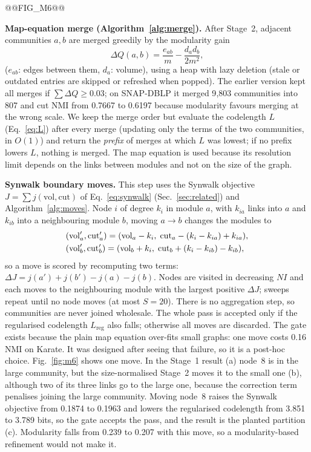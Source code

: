 \documentclass[conference]{IEEEtran}
\begin{document}
@@FIG_M6@@

\textbf{Map-equation merge (Algorithm~\ref{alg:merge}).} After Stage~2, adjacent communities $a,b$ are merged greedily by the modularity gain
\begin{equation}
\Delta Q(a,b)=\frac{e_{ab}}{m}-\frac{d_ad_b}{2m^2},\label{eq:dq}
\end{equation}
($e_{ab}$: edges between them, $d_a$: volume), using a heap with lazy deletion (stale or outdated entries are skipped or refreshed when popped). The earlier version kept all merges if $\sum\Delta Q\ge0.03$; on SNAP-DBLP it merged 9{,}803 communities into 807 and cut NMI from 0.7667 to 0.6197 because modularity favours merging at the wrong scale. We keep the merge order but evaluate the codelength $L$ (Eq.~\eqref{eq:L}) after every merge (updating only the terms of the two communities, in $O(1)$) and return the \emph{prefix} of merges at which $L$ was lowest; if no prefix lowers $L$, nothing is merged. The map equation is used because its resolution limit depends on the links between modules and not on the size of the graph.

\textbf{Synwalk boundary moves.} This step uses the Synwalk objective $J=\sum j(\mathrm{vol},\mathrm{cut})$ of Eq.~\eqref{eq:synwalk} (Sec.~\ref{sec:related}) and Algorithm~\ref{alg:moves}. Node $i$ of degree $k_i$ in module $a$, with $k_{ia}$ links into $a$ and $k_{ib}$ into a neighbouring module $b$, moving $a\to b$ changes the modules to
\begin{align}
&(\mathrm{vol}_a',\mathrm{cut}_a')=(\mathrm{vol}_a-k_i,\;\mathrm{cut}_a-(k_i-k_{ia})+k_{ia}),\notag\\
&(\mathrm{vol}_b',\mathrm{cut}_b')=(\mathrm{vol}_b+k_i,\;\mathrm{cut}_b+(k_i-k_{ib})-k_{ib}),\label{eq:move}
\end{align}
so a move is scored by recomputing two terms: $\Delta J=j(a')+j(b')-j(a)-j(b)$. Nodes are visited in decreasing $NI$ and each moves to the neighbouring module with the largest positive $\Delta J$; sweeps repeat until no node moves (at most $S=20$). There is no aggregation step, so communities are never joined wholesale. The whole pass is accepted only if the regularised codelength $L_{\mathrm{reg}}$ also falls; otherwise all moves are discarded. The gate exists because the plain map equation over-fits small graphs: one move costs 0.16 NMI on Karate. It was designed after seeing that failure, so it is a post-hoc choice. Fig.~\ref{fig:m6} shows one move. In the Stage~1 result (a) node~8 is in the large community, but the size-normalised Stage~2 moves it to the small one (b), although two of its three links go to the large one, because the correction term penalises joining the large community. Moving node~8 raises the Synwalk objective from 0.1874 to 0.1963 and lowers the regularised codelength from 3.851 to 3.789 bits, so the gate accepts the pass, and the result is the planted partition (c). Modularity falls from 0.239 to 0.207 with this move, so a modularity-based refinement would not make it.
\end{document}
